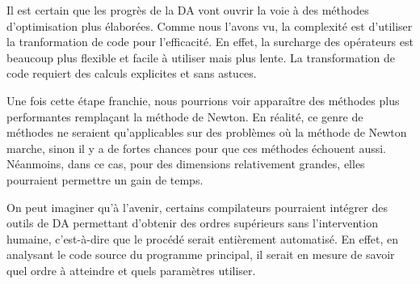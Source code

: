 \documentclass[caractereUtf,maitrise]{style/scienceUdeS}
\newcommand{\co}{}
\begin{document}
Il est certain que les progr\`es de la DA vont ouvrir la voie \`a des m\'ethodes d'optimisation plus \'elabor\'ees. Comme nous l'avons
vu, la complexit\'e est d'utiliser la tranformation de code pour l'efficacit\'e. En effet, la surcharge des op\'erateurs 
est beaucoup plus flexible et facile \`a utiliser mais plus lente. La transformation de code requiert des calculs 
explicites et sans astuces. 
{\co 
 Une fois cette \'etape franchie, nous pourrions voir apparaître des m\'ethodes plus 
performantes remplaçant la m\'ethode de Newton. En r\'ealit\'e, ce genre de m\'ethodes ne seraient qu'applicables sur 
des probl\`emes o\`u la m\'ethode de Newton marche, sinon il y a de fortes chances pour que ces m\'ethodes \'echouent aussi. 
N\'eanmoins, dans ce cas, pour des dimensions relativement grandes, elles pourraient permettre un gain de temps.

On peut imaginer qu'\`a l'avenir, certains compilateurs pourraient int\'egrer des outils de DA permettant d'obtenir des ordres sup\'erieurs sans
l'intervention humaine, c'est-\`a-dire que le proc\'ed\'e serait enti\`erement automatis\'e. En effet, en analysant le code source du programme principal,
il serait en mesure de savoir quel ordre \`a atteindre et quels param\`etres utiliser.

}
\nocite{choleskymod}
\nocite{355936}
\nocite{Iri89onautomatic}
\nocite{convnewton}
\nocite{diffautoopa}
\nocite{Griewank2008EDP}
\nocite{paresseuse} 
\nocite{differentiaauto}
\nocite{historical}
\nocite{cauchy}
\nocite{implementation}
\nocite{Kantorovich}
\nocite{Higham}
\nocite{Baur}
\nocite{Ulbrich}
\nocite{Kchouk}
\nocite{Bunch}
\nocite{More}
\nocite{Corliss1991b}
\nocite{opt}
\nocite{nocedal99}


\appendix
\renewcommand{\chaptermark}[1]{\markboth{\textsc{\appendixname\ \thechapter.\ #1}}{}}

\end{document}
